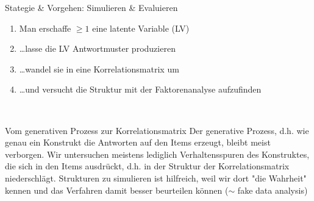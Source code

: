 \documentclass[
  ignorenonframetext,
]{beamer}
\providecommand{\tightlist}{%
  \setlength{\itemsep}{0pt}\setlength{\parskip}{0pt}}
\begin{document}
\begin{frame}{Stategie \& Vorgehen: Simulieren \& Evaluieren}
\protect\hypertarget{stategie-vorgehen-simulieren-evaluieren}{}
\begin{enumerate}
\tightlist
\item
  Man erschaffe \(\geq 1\) eine latente Variable (LV)
\item
  \ldots lasse die LV Antwortmuster produzieren
\item
  \ldots wandel sie in eine Korrelationsmatrix um
\item
  \ldots und versucht die Struktur mit der Faktorenanalyse aufzufinden
\end{enumerate}

~

\begin{block}{Vom generativen Prozess zur Korrelationsmatrix}
Der generative Prozess, d.h. wie genau ein Konstrukt die Antworten auf den Items
erzeugt, bleibt meist verborgen. Wir untersuchen meistens lediglich
Verhaltensspuren des Konstruktes, die sich in den Items ausdrückt, d.h. in der
Struktur der Korrelationsmatrix niederschlägt. Strukturen zu simulieren ist
hilfreich, weil wir dort "die Wahrheit" kennen und das Verfahren damit besser
beurteilen können ($\sim$ fake data analysis)
\end{block}
\end{frame}
\end{document}
